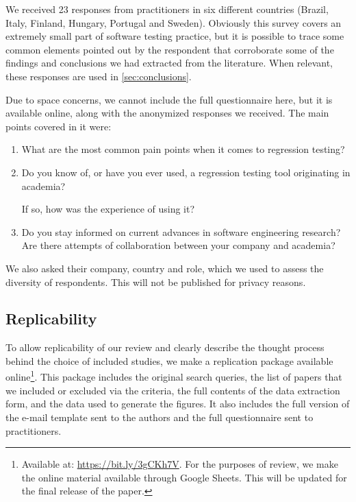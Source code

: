 We received 23 responses from practitioners in six different countries (Brazil, Italy, Finland, Hungary, Portugal and Sweden). 
Obviously this survey covers an extremely small part of software testing practice, but it is possible to trace some common elements pointed out by the respondent that corroborate some of the findings and conclusions we had extracted from the literature.
When relevant, these responses are used in \autoref{sec:conclusions}.

Due to space concerns, we cannot include the full questionnaire here, but it is available online, along with the anonymized responses we received.
The main points covered in it were:
\begin{tcolorbox}%
\small
\begin{enumerate}
	\item What are the most common pain points when it comes to regression testing?
	
	\item Do you know of, or have you ever used, a regression testing tool originating in academia?

	\subitem If so, how was the experience of using it?
	
	\item Do you stay informed on current advances in software engineering research? Are there attempts of collaboration between your company and academia?
	
\end{enumerate}
\end{tcolorbox}

We also asked their company, country and role, which we used to assess the diversity of respondents. This will not be published for privacy reasons.

\subsection{Replicability}
\label{subsec:replicability}

To allow replicability of our review and clearly describe the thought process behind the choice of included studies, we make a replication package available online\footnote{Available at: \url{https://bit.ly/3gCKh7V}.
For the purposes of review, we make the online material available through Google Sheets. This will be updated for the final release of the paper.}.
This package includes the original search queries, the list of papers that we included or excluded via the criteria, the full contents of the data extraction form, and the data used to generate the figures.
It also includes the full version of the e-mail template sent to the authors and the full questionnaire sent to practitioners.